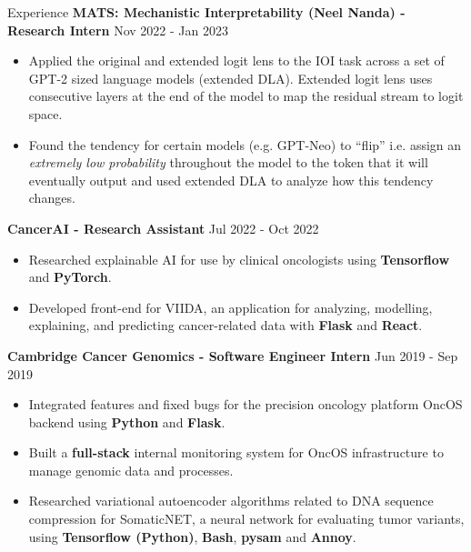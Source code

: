 \documentclass[hidelinks]{resume} %
\begin{document}
\begin{rSection}{Experience}
\textbf{MATS: Mechanistic Interpretability (Neel Nanda) - Research Intern}
\hfill {Nov 2022 - Jan 2023}
\begin{itemize}
    \item Applied the original and extended logit lens to the IOI task across a set of GPT-2 sized language models (extended DLA). Extended logit lens uses consecutive layers at the end of the model to map the residual stream to logit space.
    \item Found the tendency for certain models (e.g. GPT-Neo) to ``flip'' i.e. assign an \textit{extremely low probability} throughout the model to the token that it will eventually output and used extended DLA to analyze how this tendency changes.
\end{itemize}

\textbf{CancerAI - Research Assistant}
\hfill {Jul 2022 - Oct 2022}
\begin{itemize}
    \item Researched explainable AI for use by clinical oncologists using \textbf{Tensorflow} and \textbf{PyTorch}.
    \item Developed front-end for VIIDA, an application for analyzing, modelling, explaining, and predicting cancer-related data with \textbf{Flask} and \textbf{React}.
\end{itemize}

\textbf{Cambridge Cancer Genomics - Software Engineer Intern}
\hfill {Jun 2019 - Sep 2019}
\begin{itemize}
    \item Integrated features and fixed bugs for the precision oncology platform OncOS backend using \textbf{Python} and \textbf{Flask}.
    \item Built a \textbf{full-stack} internal monitoring system for OncOS infrastructure to manage genomic data and processes.
    \item Researched variational autoencoder algorithms related to DNA sequence compression for SomaticNET, a neural network for evaluating tumor variants, using \textbf{Tensorflow (Python)}, \textbf{Bash}, \textbf{pysam} and \textbf{Annoy}.
\end{itemize}

\end{rSection} 
\end{document}
